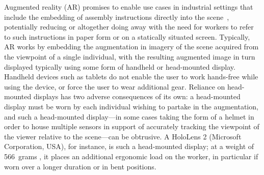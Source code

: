 \documentclass[review]{elsarticle}
\begin{document}
Augmented reality (AR) \cite{van2010survey,zhou2008trends} promises to enable use cases in industrial settings that include the embedding of assembly instructions directly into the scene~\cite{schlund2018moglichkeiten,uva2018evaluating,masood2019augmented,gattullo2019towards,aschenbrenner2019comparing,mayrhofer2019one,rupprecht2020information,Rupprecht2021}, potentially reducing or altogether doing away with the need for workers to refer to such instructions in paper form or on a statically situated screen. Typically, AR works by embedding the augmentation in imagery of the scene acquired from the viewpoint of a single individual, with the resulting augmented image in turn displayed typically using some form of handheld or head-mounted display. Handheld devices such as tablets do not enable the user to work hands-free while using the device, or force the user to wear additional gear. Reliance on head-mounted displays has two adverse consequences of its own: a head-mounted display must be worn by each individual wishing to partake in the augmentation, and such a head-mounted display---in some cases taking the form of a helmet in order to house multiple sensors in support of accurately tracking the viewpoint of the viewer relative to the scene---can be obtrusive. A HoloLens 2 (Microsoft Corporation, USA), for instance, is such a head-mounted display; at a weight of 566~grams \cite{hololens}, it places an additional ergonomic load on the worker, in particular if worn over a longer duration or in bent positions.
\end{document}
